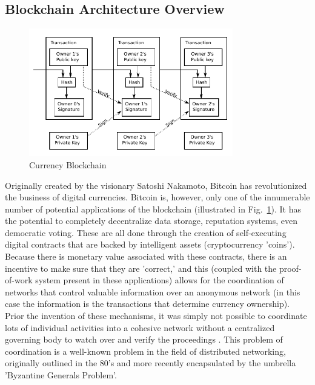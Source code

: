 \documentclass[12pt,journal]{IEEEtran}
\begin{document}
\subsection{Blockchain Architecture Overview}
\begin{figure}[!t]
\centering
\includegraphics[width=3.5in]{figures/vector/btcBlockchain}
\caption{Currency Blockchain\cite{Nakamoto2008}}
\label{fig_curChain}
\end{figure}
Originally created by the visionary Satoshi Nakamoto, Bitcoin has revolutionized the business of digital currencies\cite{Okupski2014}. Bitcoin is, however, only one of the innumerable number of potential applications of the blockchain (illustrated in Fig.~\ref{fig_curChain}). It has the potential to completely decentralize data storage, reputation systems, even democratic voting. These are all done through the creation of self-executing digital contracts that are backed by intelligent assets (cryptocurrency 'coins'). Because there is monetary value associated with these contracts, there is an incentive to make sure that they are 'correct,' and this (coupled with the proof-of-work\cite{Nakamoto2008} system present in these applications) allows for the coordination of networks that control valuable information over an anonymous network (in this case the information is the transactions that determine currency ownership). Prior the invention of these mechanisms, it was simply not possible to coordinate lots of individual activities into a cohesive network without a centralized governing body to watch over and verify the proceedings \cite{wright2015decentralized}. This problem of coordination is a well-known problem in the field of distributed networking, originally outlined in the 80's \cite{Preneel2003} and more recently encapsulated by the umbrella 'Byzantine Generals Problem'\cite{lamport1982byzantine}. \par
\end{document}
